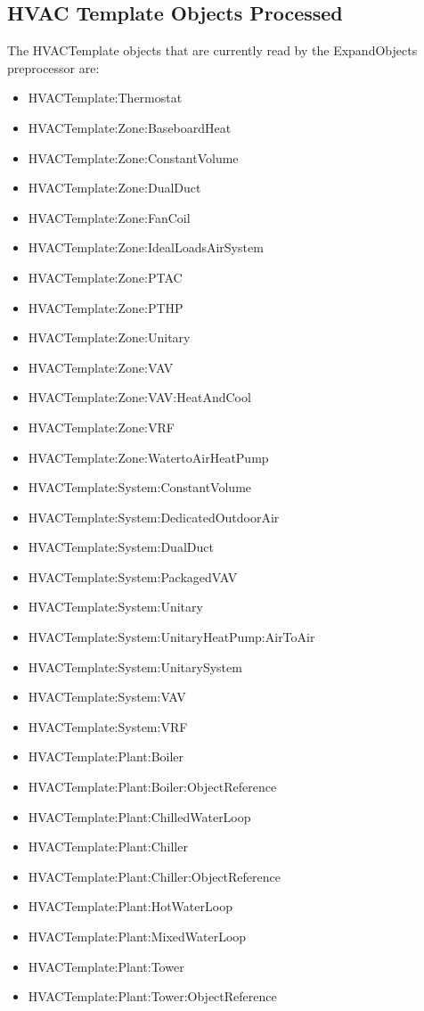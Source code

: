 \subsection{HVAC Template Objects Processed}\label{hvac-template-objects-processed}

The HVACTemplate objects that are currently read by the ExpandObjects preprocessor are:

\begin{itemize}
\item
  HVACTemplate:Thermostat
\item
  HVACTemplate:Zone:BaseboardHeat
\item
  HVACTemplate:Zone:ConstantVolume
\item
  HVACTemplate:Zone:DualDuct
\item
  HVACTemplate:Zone:FanCoil
\item
  HVACTemplate:Zone:IdealLoadsAirSystem
\item
  HVACTemplate:Zone:PTAC
\item
  HVACTemplate:Zone:PTHP
\item
  HVACTemplate:Zone:Unitary
\item
  HVACTemplate:Zone:VAV
\item
  HVACTemplate:Zone:VAV:HeatAndCool
\item
  HVACTemplate:Zone:VRF
\item
  HVACTemplate:Zone:WatertoAirHeatPump
\item
  HVACTemplate:System:ConstantVolume
\item
  HVACTemplate:System:DedicatedOutdoorAir
\item
  HVACTemplate:System:DualDuct
\item
  HVACTemplate:System:PackagedVAV
\item
  HVACTemplate:System:Unitary
\item
  HVACTemplate:System:UnitaryHeatPump:AirToAir
\item
  HVACTemplate:System:UnitarySystem
\item
  HVACTemplate:System:VAV
\item
  HVACTemplate:System:VRF
\item
  HVACTemplate:Plant:Boiler
\item
  HVACTemplate:Plant:Boiler:ObjectReference
\item
  HVACTemplate:Plant:ChilledWaterLoop
\item
  HVACTemplate:Plant:Chiller
\item
  HVACTemplate:Plant:Chiller:ObjectReference
\item
  HVACTemplate:Plant:HotWaterLoop
\item
  HVACTemplate:Plant:MixedWaterLoop
\item
  HVACTemplate:Plant:Tower
\item
  HVACTemplate:Plant:Tower:ObjectReference
\end{itemize}